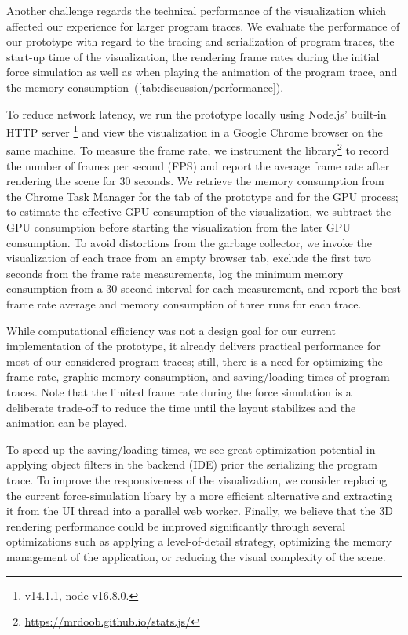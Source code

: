 Another challenge regards the technical performance of the visualization which affected our experience for larger program traces.
We evaluate the performance of our prototype with regard to the tracing and serialization of program traces, the start-up time of the visualization, the rendering frame rates during the initial force simulation as well as when playing the animation of the program trace, and the memory consumption~(\cref{tab:discussion/performance}).

To reduce network latency, we run the \tfd{} prototype locally using Node.js' built-in HTTP server \footnote{ v14.1.1, node v16.8.0.} and view the visualization in a Google Chrome browser on the same machine.
To measure the frame rate, we instrument the  library\footnote{\url{https://mrdoob.github.io/stats.js/}} to record the number of frames per second (FPS) and report the average frame rate after rendering the scene for 30 seconds.
We retrieve the memory consumption from the Chrome Task Manager for the tab of the \tfd{} prototype and for the GPU process; to estimate the effective GPU consumption of the visualization, we subtract the GPU consumption before starting the visualization from the later GPU consumption.
To avoid distortions from the garbage collector, we invoke the visualization of each trace from an empty browser tab, exclude the first two seconds from the frame rate measurements, log the minimum memory consumption from a 30-second interval for each measurement, and report the best frame rate average and memory consumption of three runs for each trace.

While computational efficiency was not a design goal for our current implementation of the \tfd{} prototype, it already delivers practical performance for most of our considered program traces; still, there is a need for optimizing the frame rate, graphic memory consumption, and saving/loading times of program traces.
Note that the limited frame rate during the force simulation is a deliberate trade-off to reduce the time until the layout stabilizes and the animation can be played.

To speed up the saving/loading times, we see great optimization potential in applying object filters in the backend (IDE) prior the serializing the program trace.
To improve the responsiveness of the visualization, we consider replacing the current force-simulation libary  by a more efficient alternative and extracting it from the UI thread into a parallel web worker.
Finally, we believe that the 3D rendering performance could be improved significantly through several optimizations such as applying a level-of-detail strategy, optimizing the memory management of the application, or reducing the visual complexity of the scene.
